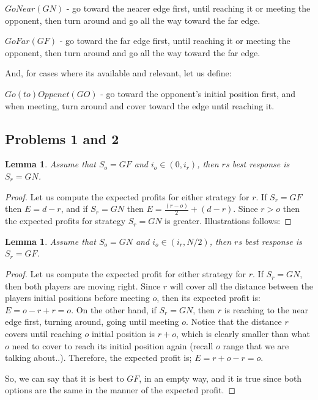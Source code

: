 \documentclass[a4paper,10pt]{article}
\newtheorem{lemma}[theorem]{Lemma}
\newcommand\rob{\ensuremath{r}\xspace}
\newcommand\opp{\ensuremath{o}\xspace}
\newcommand{\gn}{\ensuremath{GN}\xspace}
\newcommand{\gf}{\ensuremath{GF}\xspace}
\newcommand{\go}{\ensuremath{GO}\xspace}
\begin{document}
$GoNear(\gn)$ - go toward the nearer edge first, until reaching it or meeting the opponent, then turn around and go all the way toward the far edge.

$GoFar(\gf)$ - go toward the far edge first, until reaching it or meeting the opponent, then turn around and go all the way toward the far edge.

And, for cases where its available and relevant, let us define:

$Go(to)Oppenet(\go)$ - go toward the opponent's initial position first, and when meeting, turn around and cover toward the edge until reaching it.

\subsection{Problems 1 and 2} \label{subsections: full and partial information, 1D world}
\begin{lemma}
Assume that $ S_\opp=\gf$ and $i_\opp \in (0,i_\rob)$, then {\rob}s best response is $S_\rob=\gn$.
\end{lemma}
\begin{proof}
Let us compute the expected profits for either strategy for \rob.
If $S_{\rob}=\gf$ then $E=d-r$, and if $S_{\rob}=\gn$ then $E=\frac{(r-o)}{2} + (d-r)$. Since $r > o$ then the expected profits for strategy $S_{\rob}=\gn$ is greater. Illustrations follows:
\end{proof}

\begin{lemma}
Assume that $ S_\opp=\gn$ and $i_\opp \in (i_\rob, N/2)$, then {\rob}s best response is $S_\rob=\gf$.
\end{lemma}
\begin{proof}
Let us compute the expected profit for either strategy for \rob. If $S_{\rob}=\gn$, then both players are moving right. Since \rob will cover all the distance between the players initial positions before meeting \opp, then its expected profit is: $E=o-r+r=o$. On the other hand, if $S_{\rob}=\gn$, then \rob is reaching to the near edge first, turning around, going until meeting \opp. Notice that the distance \rob covers until reaching \opp initial position is $r+o$, which is clearly smaller than what \opp need to cover to reach its initial position again (recall \opp range that we are talking about..). Therefore, the expected profit is; $E=r+o-r=o$.

So, we can say that it is best to $\gf$, in an empty way, and it is true since both options are the same in the manner of the expected profit.
\end{proof}
\end{document}
